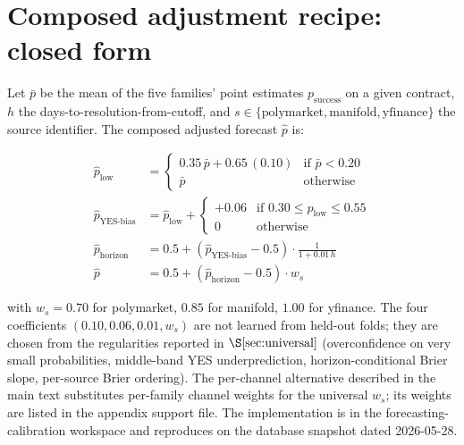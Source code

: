 \documentclass[11pt]{article}
\begin{document}
\section{Composed adjustment recipe: closed form}
\label{app:composed-adjustment-recipe}

Let $\bar p$ be the mean of the five families' point estimates $p_{\text{success}}$ on a given contract, $h$ the days-to-resolution-from-cutoff, and $s\in\{\textrm{polymarket}, \textrm{manifold}, \textrm{yfinance}\}$ the source identifier. The composed adjusted forecast $\hat p$ is:

\begin{align*}
\hat p_{\mathrm{low}} &= \begin{cases} 0.35\,\bar p + 0.65\,(0.10) & \text{if } \bar p < 0.20 \\ \bar p & \text{otherwise} \end{cases} \\
\hat p_{\mathrm{YES\text{-}bias}} &= \hat p_{\mathrm{low}} + \begin{cases} +0.06 & \text{if } 0.30 \le \hat p_{\mathrm{low}} \le 0.55 \\ 0 & \text{otherwise} \end{cases} \\
\hat p_{\mathrm{horizon}} &= 0.5 + (\hat p_{\mathrm{YES\text{-}bias}} - 0.5)\cdot \tfrac{1}{1 + 0.01\,h} \\
\hat p &= 0.5 + (\hat p_{\mathrm{horizon}} - 0.5)\cdot w_s
\end{align*}

with $w_s = 0.70$ for polymarket, $0.85$ for manifold, $1.00$ for yfinance. The four coefficients $(0.10, 0.06, 0.01, w_s)$ are not learned from held-out folds; they are chosen from the regularities reported in $\S\ref{sec:universal}$ (overconfidence on very small probabilities, middle-band YES underprediction, horizon-conditional Brier slope, per-source Brier ordering). The per-channel alternative described in the main text substitutes per-family channel weights for the universal $w_s$; its weights are listed in the appendix support file. The implementation is in the forecasting-calibration workspace and reproduces on the database snapshot dated 2026-05-28.
\end{document}
